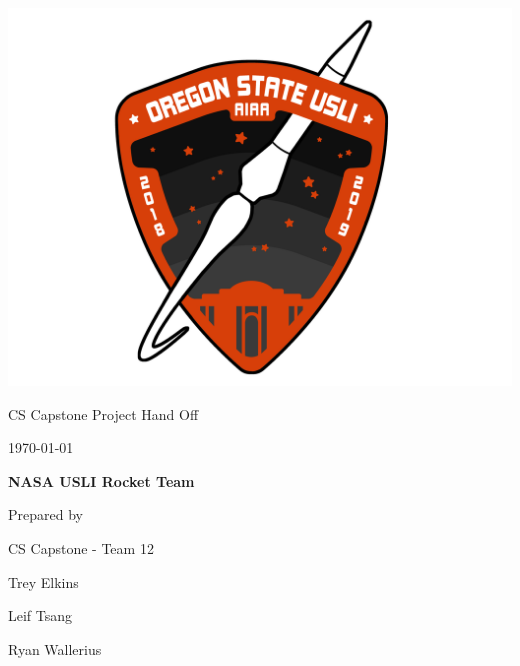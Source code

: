 \documentclass[onecolumn, draftclsnofoot, 10pt, compsoc]{IEEEtran}
\def \CapstoneTeamName{			Team 12}
\def \GroupName{				CS Capstone - Team 12}
\def \GroupMemberOne{			Trey Elkins}
\def \GroupMemberTwo{			Leif Tsang}
\def \GroupMemberThree{			Ryan Wallerius}
\def \CapstoneProjectName{		NASA USLI Rocket Team}
\def \DocType{		%
				}
\newcommand{\NameSigPair}[1]{
	\par
	\makebox[2.75in][r]{#1} \hfill
	\makebox[3.25in]{\makebox[2.25in]{\hrulefill} \hfill \makebox[.75in]{\hrulefill}}
	\par\vspace{-12pt}
	\textit{
		\tiny\noindent \makebox[2.75in]{} \hfill
		\makebox[3.25in]{\makebox[2.25in][r]{Signature} \hfill \makebox[.75in][r]{Date}}
	}
}
\renewcommand{\NameSigPair}[1]{#1}
\begin{document}
\begin{titlepage}
    \begin{singlespace}
        \hfill 
        \begin{center}
           \includegraphics[scale = 0.2]{2019patch.png}\\[1.0 cm]

        \par\vspace{.2in}
        \scshape{
            \huge CS Capstone Project Hand Off \DocType \par
            {\large\today}\par
            \vspace{.5in}
            \textbf{\Huge\CapstoneProjectName}\par
            \vfill
            {\large Prepared by }\par
           	\GroupName\par
            \vspace{5pt}
            {\Large
                \NameSigPair{\GroupMemberOne}\par
                \NameSigPair{\GroupMemberTwo}\par
                \NameSigPair{\GroupMemberThree}\par
            }
            \vspace{20pt}
        }
        \end{center}
    \end{singlespace}
    

\end{titlepage}
\end{document}
